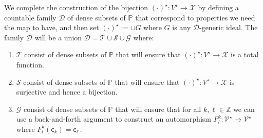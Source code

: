 \documentclass[10pt,a4paper, openany,  oldfontcommands]{memoir}
\newtheorem{open problem} [theorem] {Open Problem}
\begin{document}
We   complete the construction of  the  bijection     $  (  \cdot )^{  \star }   :  V^{  \star }     \to        \mathcal{X}   $ by defining 
 a countable  family  $  \mathcal{D} $ of dense subsets of  $  \mathbb{P} $  that correspond to properties  we need the map  to have, 
 and  then set   $ (  \cdot )^{  \star }  :=   \cup G $  where  $G$ is any  $  \mathcal{D} $-generic  ideal. 
 The family  $  \mathcal{D} $  will be a union  $   \mathcal{D}   =   \mathcal{T}  \cup   \mathcal{S}  \cup  \mathcal{G} $  where: 
 \begin{enumerate}
 
\item   $  \mathcal{T}  $   consist of dense subsets of $  \mathbb{P} $ that will ensure that 
$ (  \cdot )^{  \star }    :  V^{  \star }  \to  \mathcal{X} $ is a total function. 
 
 
 
 
 \item   $  \mathcal{S}  $   consist of dense subsets of $  \mathbb{P} $ that will ensure that 
 $ (  \cdot )^{  \star }    :  V^{  \star }  \to  \mathcal{X} $ is surjective and hence a bijection. 


\item  $  \mathcal{G}    $    consist of dense subsets of $  \mathbb{P} $ that will ensure that    for all   $k, \ell   \in   \mathbb{Z} $ we can use a  back-and-forth argument  to construct an  automorphism 
 $  F^k_l  :    \mathcal{V}^{  \star }  \to   \mathcal{V}^{ \star }   $  
where    $   F^k_l   \left(   \mathsf{c}_k    \right)    =    \mathsf{c}_ {  \ell }      \,  $. 
 \end{enumerate}



 

 
 
 
 
 
 


 
 
\end{document}
